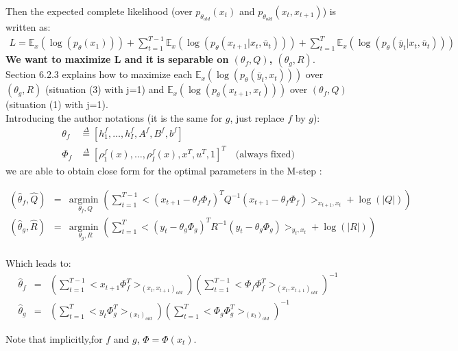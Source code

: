 Then the expected complete likelihood (over $p_{\theta_{old}}(x_t)$ and $p_{\theta_{old}}(x_t,x_{t+1})$) is written as:
\begin{eqnarray}
L=\mathbb{E}_x(\log(p_{\theta}(x_1)))+\sum_{t=1}^{T-1}{\mathbb{E}_x(\log(p_{\theta}(x_{t+1}|x_t,\overline{u}_t)))}+\sum_{t=1}^{T}{\mathbb{E}_x(\log(p_{\theta}(\overline{y}_t|x_t,\overline{u}_t)))}\nonumber
\end{eqnarray}
\textbf{We want to maximize L and it is separable on $(\theta_f,Q)$, $(\theta_g,R)$}.\\

Section 6.2.3 explains how to maximize each $\mathbb{E}_x(\log(p_{\theta}(\overline{y}_t,x_t)))$ over $(\theta_g,R)$ (situation (3) with j=1) and $\mathbb{E}_x(\log(p_{\theta}(x_{t+1},x_t)))$ over $(\theta_f,Q)$ (situation (1) with j=1).\\
Introducing the author notations (it is the same for $g$, just replace $f$ by $g$): 
\begin{align*}
\theta_f & \overset{\Delta}{=} [h_1^f, \ldots, h_I^f, A^f, B^f, b^f] \\
\Phi_f & \overset{\Delta}{=} [\rho_1^f(x),\ldots, \rho_I^f(x), x^T, u^T, 1]^T \quad\text{(always fixed)} 
\end{align*}
we are able to obtain close form for the optimal parameters in the M-step :

\begin{eqnarray}
(\hat{\theta}_f,\hat{Q})&=&\underset{\theta_f,Q}{\text{argmin }}{\left(\sum_{t=1}^{T-1}{
<(x_{t+1}-\theta_f\Phi_f)^T Q^{-1}(x_{t+1}-\theta_f\Phi_f) >_{x_{t+1},x_t}+\log(|Q|)
}\right)}\nonumber\\
(\hat{\theta}_g,\hat{R})&=&\underset{\theta_g,R}{\text{argmin }}{\left(\sum_{t=1}^{T}{
<(y_{t}-\theta_g\Phi_g)^T R^{-1}(y_{t}-\theta_g\Phi_g) >_{y_t,x_t}+\log(|R|)
}\right)}\nonumber\\
\end{eqnarray}

Which leads to:
\begin{eqnarray}
\hat{\theta}_f&=&(\sum_{t=1}^{T-1}{<x_{t+1}\Phi_f^T >_{(x_t,x_{t+1})_{old}}})(\sum_{t=1}^{T-1}{<\Phi_f\Phi_f^T >_{(x_t,x_{t+1})_{old}}})^{-1}\\
\hat{\theta}_g&=&(\sum_{t=1}^{T}{<y_{t}\Phi_g^T >_{(x_t)_{old}}})(\sum_{t=1}^{T}{<\Phi_g\Phi_g^T >_{(x_t)_{old}}})^{-1}
\end{eqnarray}

Note that implicitly,for $f$ and $g$, $\Phi=\Phi(x_t)$.

